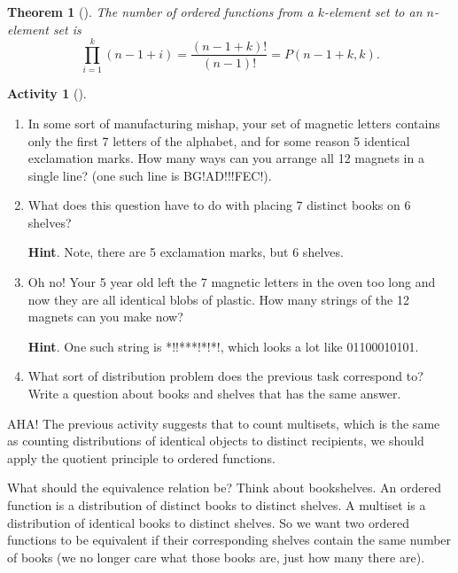 \documentclass[10pt,]{book}
\theoremstyle{plain}
\newtheorem{theorem}{Theorem}[section]
\theoremstyle{definition}
\theoremstyle{definition}
\theoremstyle{definition}
\newtheorem{activity}[project]{Activity}
\theoremstyle{definition}
\numberwithin{equation}{chapter}
\begin{document}
\begin{theorem}[{}]\label{theorem-13}
\hypertarget{p-747}{}%
The number of ordered functions from a \(k\)-element set to an \(n\)-element set is%
\begin{equation*}
\prod_{i=1}^k (n-1+i) = \frac{(n-1+k)!}{(n-1)!} = P(n-1+k, k).
\end{equation*}
%
\end{theorem}
\begin{activity}[]\label{activity-68}
\leavevmode%
\begin{enumerate}[font=\bfseries,label=(\alph*),ref=\alph*]
\item\label{task-98} \hypertarget{p-748}{}%
In some sort of manufacturing mishap, your set of magnetic letters contains only the first 7 letters of the alphabet, and for some reason 5 identical exclamation marks.  How many ways can you arrange all 12 magnets in a single line?  (one such line is BG!AD!!!FEC!).%
\item\label{task-99} \hypertarget{p-749}{}%
What does this question have to do with placing \(7\) distinct books on \(6\) shelves?%
\par\smallskip%
\noindent\textbf{Hint}.\hypertarget{hint-59}{}\quad%
\hypertarget{p-750}{}%
Note, there are 5 exclamation marks, but 6 shelves.%
\item\label{task-100} \hypertarget{p-751}{}%
Oh no! Your 5 year old left the 7 magnetic letters in the oven too long and now they are all identical blobs of plastic.  How many strings of the 12 magnets can you make now?%
\par\smallskip%
\noindent\textbf{Hint}.\hypertarget{hint-60}{}\quad%
\hypertarget{p-752}{}%
One such string is *!!***!*!*!, which looks a lot like 01100010101.%
\item\label{task-101} \hypertarget{p-753}{}%
What sort of distribution problem does the previous task correspond to?  Write a question about books and shelves that has the same answer.%
\end{enumerate}
\end{activity}
\hypertarget{p-754}{}%
AHA!  The previous activity suggests that to count multisets, which is the same as counting distributions of identical objects to distinct recipients, we should apply the quotient principle to ordered functions.%
\par
\hypertarget{p-755}{}%
What should the equivalence relation be?  Think about bookshelves.  An ordered function is a distribution of distinct books to distinct shelves.  A multiset is a distribution of identical books to distinct shelves.  So we want two ordered functions to be equivalent if their corresponding shelves contain the same number of books (we no longer care what those books are, just how many there are).%
\end{document}
